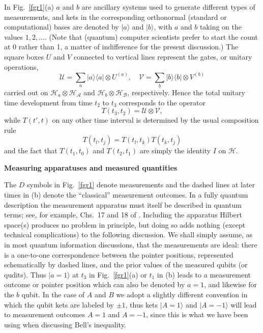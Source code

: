 \documentclass[12pt]{article} %
\def\outl#1{\par{\medskip\noindent\hspace*{.5cm}\bf
      \mathversion{bold}#1\mathversion{normal}\smallskip} }
\def\np{} \def\xa{} \def\xb{} \def\xn{} \def\xp{}
\def\outl#1{} \def\np{} \def\xa{} \def\xb{} \def\xn{} \def\xp{}
\def\outl#1{\par{\medskip\noindent\hspace*{.5cm}\bf
      \mathversion{bold}#1\mathversion{normal}\smallskip} }
\def\np{\newpage }\def\xn{\nopagebreak }\def\xp{\pagebreak }
\newcommand{\dya}[1]{|#1\rgl\lgl#1|}
\newcommand{\ket}[1]{|#1\rgl }
\newcommand{\lgl}{\langle }
\newcommand{\ot}{\otimes }
\newcommand{\rgl}{\rangle }
\newcommand{\AM}{{\mathcal A}}
\newcommand{\BM}{{\mathcal B}}
\newcommand{\HM}{{\mathcal H}}
\newcommand{\UM}{{\mathcal U}}
\newcommand{\VM}{{\mathcal V}}
\begin{document}
In Fig.~\ref{fgr1}(a) $a$ and $b$ are ancillary systems used to generate
different types of measurements, and kets in the corresponding orthonormal
(standard or computational) bases are denoted by $\ket{a}$ and $\ket{b}$, with
$a$ and $b$ taking on the values $1, 2,\ldots$. (Note that (quantum) computer
scientists prefer to start the count at 0 rather than 1, a matter of
indifference for the present discussion.) The square boxes $U$ and $V$
connected to vertical lines represent the gates, or unitary operations,
\begin{equation}
  \UM = \sum_a \dya{a}\ot U^{(a)},\quad 
 \VM = \sum_b \dya{b}\ot V^{(b)}
\label{eqn24}
\end{equation}
carried out on $\HM_a\ot\HM_\AM$ and $\HM_b\ot\HM_\BM$, respectively.  Hence
the total unitary time development from time $t_2$ to $t_3$ corresponds to the
operator
\begin{equation}
  T(t_3,t_2) = \UM\ot\VM,
\label{eqn25}
\end{equation}
while $T(t',t)$ on any other time interval is
determined by the usual composition rule
\begin{equation}
  T(t_l,t_j) = T(t_l,t_k)T(t_k,t_j)
\label{eqn26}
\end{equation}
and the fact that $T(t_1,t_0)$ and $T(t_2,t_1)$ are simply the identity $I$ on
$\HM$.

\xb
\outl{Measuring apparatuses and measured quantities}
\xa


The $D$ symbols in Fig.~\ref{fgr1} denote measurements and the dashed lines at
later times in (b) denote the ``classical'' measurement outcomes. In a fully
quantum description the measurement apparatus must itself be described in
quantum terms; see, for example, Chs.~17 and 18 of \cite{Grff02c}. Including
the apparatus Hilbert space(s) produces no problem in principle, but doing so
adds nothing (except technical complications) to the following discussion.  We
shall simply assume, as in most quantum information discussions, that the
measurements are ideal: there is a one-to-one correspondence between the
pointer positions, represented schematically by dashed lines, and the prior
values of the measured qubits (or qudits).  Thus $\ket{a=1}$ at $t_3$ in
Fig.~\ref{fgr1}(a) or $t_1$ in (b) leads to a measurement outcome or pointer
position which can also be denoted by $a=1$, and likewise for the $b$ qubit.
In the case of $A$ and $B$ we adopt a slightly different convention in which
the qubit kets are labeled by $\pm 1$, thus kets $\ket{A=1}$ and $\ket{A=-1}$
will lead to measurement outcomes $A=1$ and $A=-1$, since this is what we have
been using when discussing Bell's inequality.
\end{document}
